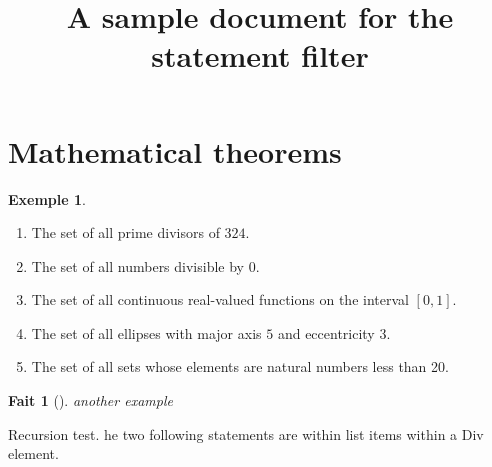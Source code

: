 \documentclass[
]{article}
\title{A sample document for the statement filter}
\author{}
\date{}
\providecommand{\tightlist}{%
  \setlength{\itemsep}{0pt}\setlength{\parskip}{0pt}}
\theoremstyle{definition}
\newtheorem*{example-unnumbered}{Exemple}
\theoremstyle{plain}
\newtheorem*{fact-unnumbered}{Fait}
\theoremstyle{empty}
\theoremstyle{definition}
\theoremstyle{plain}
\theoremstyle{definition}
\theoremstyle{plain}
\theoremstyle{definition}
\theoremstyle{plain}
\theoremstyle{definition}
\begin{document}
\maketitle

\hypertarget{mathematical-theorems}{%
\section{Mathematical theorems}\label{mathematical-theorems}}

\begin{example-unnumbered}

\begin{enumerate}
\def\labelenumi{(\alph{enumi})}
\tightlist
\item
  The set of all prime divisors of \(324\).
\item
  The set of all numbers divisible by 0.
\item
  The set of all continuous real-valued functions on the interval
  \([0,1]\).
\item
  The set of all ellipses with major axis \(5\) and eccentricity \(3\).
\item
  The set of all sets whose elements are natural numbers less than 20.
\end{enumerate}

\end{example-unnumbered}

\begin{fact-unnumbered}[\citep{reference}]

another example

\end{fact-unnumbered}

Recursion test. he two following statements are within list items within
a Div element.

\edef\docparindent{\the\parindent}
\end{document}
